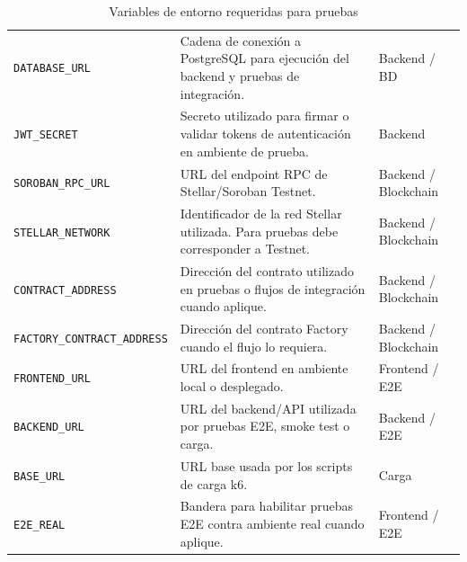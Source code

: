 \documentclass[12pt,letterpaper]{article}
\begin{document}
\begin{table}[H]
\centering

\begingroup
\scriptsize
\setlength{\tabcolsep}{3pt}
\renewcommand{\arraystretch}{1.22}

\begin{tabularx}{\textwidth}{|
>{\raggedright\arraybackslash}p{4.0cm}|
>{\raggedright\arraybackslash}X|
>{\raggedright\arraybackslash}p{3.0cm}|}
\hline
\multicolumn{1}{|>{\centering\arraybackslash}m{4.0cm}|}{\textbf{Variable}} &
\multicolumn{1}{>{\centering\arraybackslash}m{7.4cm}|}{\textbf{Propósito}} &
\multicolumn{1}{>{\centering\arraybackslash}m{3.0cm}|}{\textbf{Componente}} \\
\hline

\texttt{DATABASE\_URL} &
Cadena de conexión a PostgreSQL para ejecución del backend y pruebas de integración. &
Backend / BD \\
\hline

\texttt{JWT\_SECRET} &
Secreto utilizado para firmar o validar tokens de autenticación en ambiente de prueba. &
Backend \\
\hline

\texttt{SOROBAN\_RPC\_URL} &
URL del endpoint RPC de Stellar/Soroban Testnet. &
Backend / Blockchain \\
\hline

\texttt{STELLAR\_NETWORK} &
Identificador de la red Stellar utilizada. Para pruebas debe corresponder a Testnet. &
Backend / Blockchain \\
\hline

\texttt{CONTRACT\_ADDRESS} &
Dirección del contrato utilizado en pruebas o flujos de integración cuando aplique. &
Backend / Blockchain \\
\hline

\texttt{FACTORY\_CONTRACT\_ADDRESS} &
Dirección del contrato Factory cuando el flujo lo requiera. &
Backend / Blockchain \\
\hline

\texttt{FRONTEND\_URL} &
URL del frontend en ambiente local o desplegado. &
Frontend / E2E \\
\hline

\texttt{BACKEND\_URL} &
URL del backend/API utilizada por pruebas E2E, smoke test o carga. &
Backend / E2E \\
\hline

\texttt{BASE\_URL} &
URL base usada por los scripts de carga k6. &
Carga \\
\hline

\texttt{E2E\_REAL} &
Bandera para habilitar pruebas E2E contra ambiente real cuando aplique. &
Frontend / E2E \\
\hline

\end{tabularx}

\endgroup

\caption{Variables de entorno requeridas para pruebas}
\label{tab:variables-entorno-pruebas}
\end{table}
\end{document}
